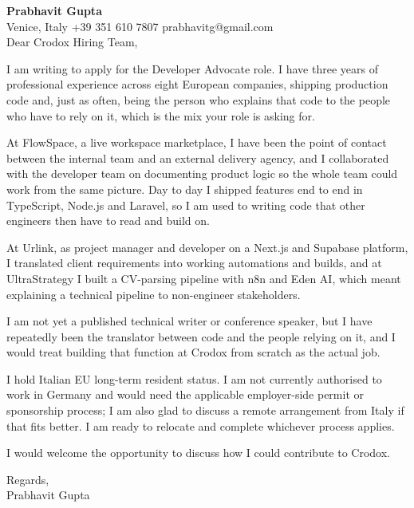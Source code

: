 \documentclass[a4paper,10.5pt]{article}
\begin{document}
\textbf{Prabhavit Gupta}\\
Venice, Italy \textbar{} +39 351 610 7807 \textbar{} prabhavitg@gmail.com\\[10pt]
Dear Crodox Hiring Team,

I am writing to apply for the Developer Advocate role. I have three years of professional experience across eight European companies, shipping production code and, just as often, being the person who explains that code to the people who have to rely on it, which is the mix your role is asking for.

At FlowSpace, a live workspace marketplace, I have been the point of contact between the internal team and an external delivery agency, and I collaborated with the developer team on documenting product logic so the whole team could work from the same picture. Day to day I shipped features end to end in TypeScript, Node.js and Laravel, so I am used to writing code that other engineers then have to read and build on.

At Urlink, as project manager and developer on a Next.js and Supabase platform, I translated client requirements into working automations and builds, and at UltraStrategy I built a CV-parsing pipeline with n8n and Eden AI, which meant explaining a technical pipeline to non-engineer stakeholders.

I am not yet a published technical writer or conference speaker, but I have repeatedly been the translator between code and the people relying on it, and I would treat building that function at Crodox from scratch as the actual job.

I hold Italian EU long-term resident status. I am not currently authorised to work in Germany and would need the applicable employer-side permit or sponsorship process; I am also glad to discuss a remote arrangement from Italy if that fits better. I am ready to relocate and complete whichever process applies.

I would welcome the opportunity to discuss how I could contribute to Crodox.

Regards,\\
Prabhavit Gupta
\end{document}
